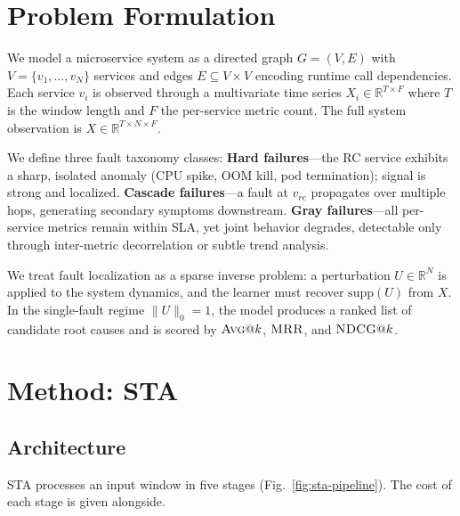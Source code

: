 \documentclass[11pt,a4paper]{article}
\makeatletter
\newcommand{\Avg}[1]{\textsc{Avg}@{#1}}
\newcommand{\MRR}{\textsc{MRR}}
\newcommand{\NDCG}[1]{\textsc{NDCG}@{#1}}
\newcommand{\STA}{\textsc{STA}}
\makeatother
\begin{document}
\section{Problem Formulation}
\label{sec:formulation}

We model a microservice system as a directed graph $G = (V, E)$ with
$V = \{v_1, \dots, v_N\}$ services and edges $E \subseteq V \times V$ encoding
runtime call dependencies. Each service $v_i$ is observed through a
multivariate time series $X_i \in \mathbb{R}^{T \times F}$ where $T$ is the
window length and $F$ the per-service metric count. The full system
observation is $X \in \mathbb{R}^{T \times N \times F}$.

We define three fault taxonomy classes:
\textbf{Hard failures}---the RC service exhibits a sharp, isolated anomaly
(CPU spike, OOM kill, pod termination); signal is strong and localized.
\textbf{Cascade failures}---a fault at $v_{rc}$ propagates over multiple hops,
generating secondary symptoms downstream.
\textbf{Gray failures}---all per-service metrics remain within SLA, yet joint
behavior degrades, detectable only through inter-metric decorrelation or
subtle trend analysis.

We treat fault localization as a sparse inverse problem: a perturbation
$U \in \mathbb{R}^N$ is applied to the system dynamics, and the learner must
recover $\mathrm{supp}(U)$ from $X$. In the single-fault regime
$\lVert U \rVert_0 = 1$, the model produces a ranked list of candidate root
causes and is scored by $\Avg{k}$, $\MRR{}$, and $\NDCG{k}$.

\section{Method: \STA{}}
\label{sec:sta}

\subsection{Architecture}
\STA{} processes an input window in five stages
(Fig.~\ref{fig:sta-pipeline}). The cost of each stage is given alongside.
\end{document}
